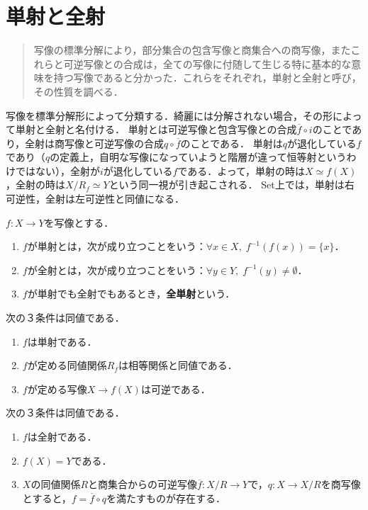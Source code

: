 \documentclass[uplatex,dvipdfmx]{jsreport}
\begin{document}
\section{単射と全射}

\begin{screen}
    \begin{quotation}
        写像の標準分解により，部分集合の包含写像と商集合への商写像，またこれらと可逆写像との合成は，全ての写像に付随して生じる特に基本的な意味を持つ写像であると分かった．これらをそれぞれ，単射と全射と呼び，その性質を調べる．
    \end{quotation}
    写像を標準分解形によって分類する．綺麗には分解されない場合，その形によって単射と全射と名付ける．
    単射とは可逆写像と包含写像との合成$\overline{f}\circ i$のことであり，全射は商写像と可逆写像の合成$q\circ\overline{f}$のことである．
    単射は$q$が退化している$f$であり（$q$の定義上，自明な写像になっていようと階層が違って恒等射というわけではない），全射が$i$が退化している$f$である．よって，単射の時は$X≃f(X)$，全射の時は$X/R_f≃Y$という同一視が引き起こされる．
    Set上では，単射は右可逆性，全射は左可逆性と同値になる．
\end{screen}

\begin{definition}
    $f:X\to Y$を写像とする．
    \begin{enumerate}
        \item $f$が単射とは，次が成り立つことをいう：$\forall x\in X,\;f^{-1}(f(x))=\{x\}$．
        \item $f$が全射とは，次が成り立つことをいう：$\forall y\in Y,\;f^{-1}(y)\ne\emptyset$．
        \item $f$が単射でも全射でもあるとき，\textbf{全単射}という．
    \end{enumerate}
\end{definition}

\begin{proposition}[全射と単射の特徴付け]
    次の３条件は同値である．
    \begin{enumerate}
        \item $f$は単射である．
        \item $f$が定める同値関係$R_f$は相等関係と同値である．
        \item $f$が定める写像$X\to f(X)$は可逆である．
    \end{enumerate}
    次の３条件は同値である．
    \begin{enumerate}
        \item $f$は全射である．
        \item $f(X)=Y$である．
        \item $X$の同値関係$R$と商集合からの可逆写像$\overline{f}:X/R\to Y$で，$q:X\to X/R$を商写像とすると，$f=\overline{f}\circ q$を満たすものが存在する．
    \end{enumerate}
\end{proposition}
\end{document}
